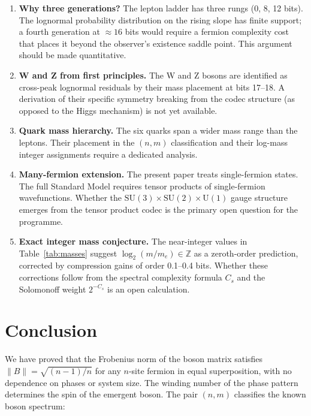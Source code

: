 \documentclass[11pt]{article}
\begin{document}
\begin{enumerate}
\item \textbf{Why three generations?}
  The lepton ladder has three rungs (0, 8, 12 bits).
  The lognormal probability distribution on the rising slope has finite
  support; a fourth generation at $\approx 16$ bits would require a
  fermion complexity cost that places it beyond the observer's existence
  saddle point.
  This argument should be made quantitative.

\item \textbf{W and Z from first principles.}
  The W and Z bosons are identified as cross-peak lognormal residuals
  by their mass placement at bits 17--18.
  A derivation of their specific symmetry breaking from the codec
  structure (as opposed to the Higgs mechanism) is not yet available.

\item \textbf{Quark mass hierarchy.}
  The six quarks span a wider mass range than the leptons.
  Their placement in the $(n, m)$ classification and their log-mass
  integer assignments require a dedicated analysis.

\item \textbf{Many-fermion extension.}
  The present paper treats single-fermion states.
  The full Standard Model requires tensor products of single-fermion
  wavefunctions.
  Whether the $\mathrm{SU}(3) \times \mathrm{SU}(2) \times \mathrm{U}(1)$
  gauge structure emerges from the tensor product codec is the primary
  open question for the programme.

\item \textbf{Exact integer mass conjecture.}
  The near-integer values in Table~\ref{tab:masses} suggest
  $\log_2(m/m_e) \in \mathbb{Z}$ as a zeroth-order prediction,
  corrected by compression gains of order 0.1--0.4 bits.
  Whether these corrections follow from the spectral complexity formula
  $C_s$ and the Solomonoff weight $2^{-C_s}$ is an open calculation.
\end{enumerate}

\section{Conclusion}
\label{sec:conclusion}

We have proved that the Frobenius norm of the boson matrix satisfies
$\|B\| = \sqrt{(n-1)/n}$ for any $n$-site fermion in equal
superposition, with no dependence on phases or system size.
The winding number of the phase pattern determines the spin of the
emergent boson.
The pair $(n, m)$ classifies the known boson spectrum:
\end{document}
